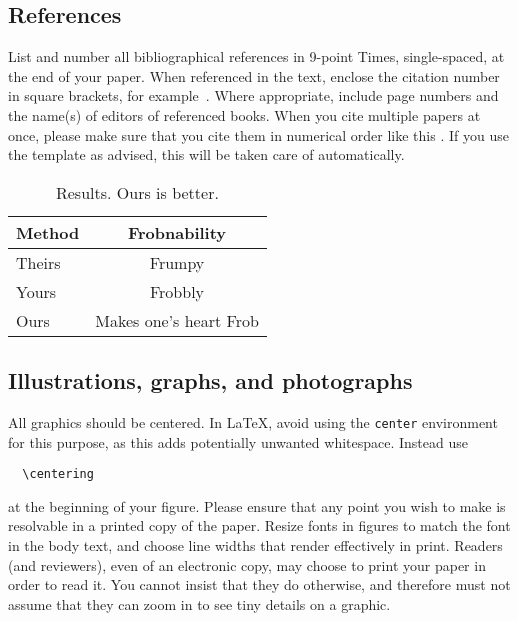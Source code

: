 \documentclass[10pt,twocolumn,letterpaper]{article}
\begin{document}
\subsection{References}

List and number all bibliographical references in 9-point Times, single-spaced, at the end of your paper.
When referenced in the text, enclose the citation number in square brackets, for
example~\cite{Authors14}.
Where appropriate, include page numbers and the name(s) of editors of referenced books.
When you cite multiple papers at once, please make sure that you cite them in numerical order like this \cite{Alpher02,Alpher03,Alpher05,Authors14b,Authors14}.
If you use the template as advised, this will be taken care of automatically.

\begin{table}
  \centering
  \begin{tabular}{@{}lc@{}}
    \toprule
    Method & Frobnability \\
    \midrule
    Theirs & Frumpy \\
    Yours & Frobbly \\
    Ours & Makes one's heart Frob\\
    \bottomrule
  \end{tabular}
  \caption{Results.   Ours is better.}
  \label{tab:example}
\end{table}

\subsection{Illustrations, graphs, and photographs}

All graphics should be centered.
In \LaTeX, avoid using the \texttt{center} environment for this purpose, as this adds potentially unwanted whitespace.
Instead use
{\small\begin{verbatim}
  \centering
\end{verbatim}}
at the beginning of your figure.
Please ensure that any point you wish to make is resolvable in a printed copy of the paper.
Resize fonts in figures to match the font in the body text, and choose line widths that render effectively in print.
Readers (and reviewers), even of an electronic copy, may choose to print your paper in order to read it.
You cannot insist that they do otherwise, and therefore must not assume that they can zoom in to see tiny details on a graphic.
\end{document}
